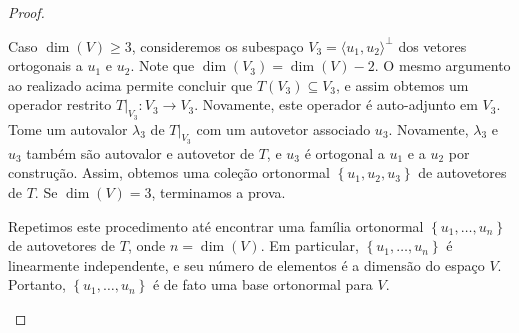 \begin{proof}
\begin{enumerate}
		Caso $\dim(V)\geq 3$, consideremos os subespaço $V_3=\langle u_1,u_2\rangle^\perp$ dos vetores ortogonais a $u_1$ e $u_2$. Note que $\dim(V_3)=\dim(V)-2$. O mesmo argumento ao realizado acima permite concluir que $T(V_3)\subseteq V_3$, e assim obtemos um operador restrito $T|_{V_3}\colon V_3\to V_3$. Novamente, este operador é auto-adjunto em $V_3$. Tome um autovalor $\lambda_3$ de $T|_{V_3}$ com um autovetor associado $u_3$. Novamente, $\lambda_3$ e $u_3$ também são autovalor e autovetor de $T$, e $u_3$ é ortogonal a $u_1$ e a $u_2$ por construção. Assim, obtemos uma coleção ortonormal $\left\{u_1,u_2,u_3\right\}$ de autovetores de $T$. Se $\dim(V)=3$, terminamos a prova.
		
		Repetimos este procedimento até encontrar uma família ortonormal $\left\{u_1,\ldots,u_n\right\}$ de autovetores de $T$, onde $n=\dim(V)$. Em particular, $\left\{u_1,\ldots,u_n\right\}$ é linearmente independente, e seu número de elementos é a dimensão do espaço $V$. Portanto, $\left\{u_1,\ldots,u_n\right\}$ é de fato uma base ortonormal para $V$.
	\end{enumerate}
	
\end{proof}